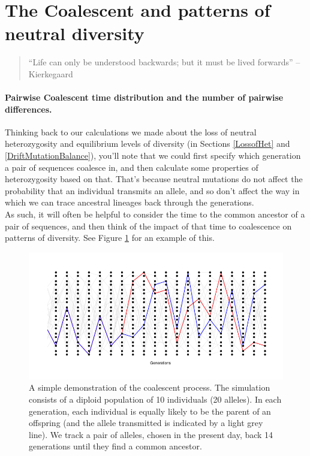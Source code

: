 \section{The Coalescent and patterns of neutral diversity}

\begin{quote}
``Life can only be understood backwards; but it must be lived
forwards'' -- Kierkegaard
\end{quote}

\paragraph{Pairwise Coalescent time distribution and the number of
 pairwise differences.}
Thinking back to our calculations we made about the loss of neutral heterozygosity
and equilibrium levels of diversity (in Sections \ref{LossofHet} and \ref{DriftMutationBalance}), you'll note that we could first specify
which generation a pair of sequences coalesce in, and then calculate
some properties of heterozygosity based on that. That's because neutral
mutations do not affect the probability that an individual transmits
an allele, and so don't affect the way in which we can trace ancestral lineages
back through the generations. \\


As such, it will often be helpful to consider the time to the common
ancestor of a pair of sequences, and then think of the impact of that time to coalescence
on patterns of diversity. See Figure \ref{fig:Coalescent_simulation}
for an example of this.

\begin{figure}
\begin{center}
\includegraphics[width=\textwidth]{figures/Coalescent.png}
\end{center}
\caption{A simple demonstration of the coalescent process. The simulation
  consists of a diploid population of 10 individuals (20 alleles). In
  each generation, each individual is equally likely to be the parent
  of an offspring (and the allele transmitted is indicated by a light
  grey line).  We track a
  pair of alleles, chosen in the present day, back 14 generations
  until they find a common ancestor.  } \label{fig:Coalescent_simulation}  %
\end{figure}

